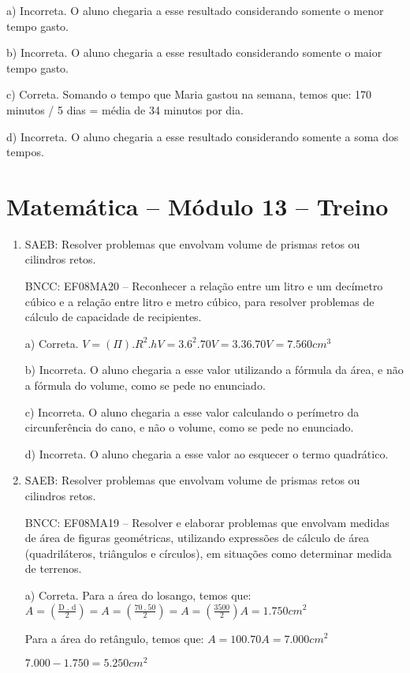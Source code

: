 \begin{enumerate}
a) Incorreta. O aluno chegaria a esse resultado considerando
somente o menor tempo gasto.

b) Incorreta. O aluno chegaria a esse resultado considerando
somente o maior tempo gasto.

c) Correta. Somando o tempo que Maria gastou na semana, temos que:
170 minutos / 5 dias = média de 34 minutos por dia.

d) Incorreta. O aluno chegaria a esse resultado considerando
somente a soma dos tempos.
\end{enumerate}


\section*{Matemática – Módulo 13 – Treino}
\begin{enumerate}
\item SAEB: Resolver problemas que envolvam volume de prismas retos ou
cilindros retos.

BNCC: EF08MA20 -- Reconhecer a relação entre um litro e um decímetro
cúbico e a relação entre litro e metro cúbico, para resolver problemas
de cálculo de capacidade de recipientes.

a) Correta.
$V = (\Pi) . R^2 .h
V = 3 . 6^2 . 70
V = 3 . 36 . 70
V = 7.560 cm^3$

b) Incorreta. O aluno chegaria a esse valor utilizando a fórmula da
área, e não a fórmula do volume, como se pede no enunciado.

c) Incorreta. O aluno chegaria a esse valor calculando o perímetro
da circunferência do cano, e não o volume, como se pede no enunciado.

d) Incorreta. O aluno chegaria a esse valor ao esquecer o termo
quadrático.
\item SAEB: Resolver problemas que envolvam volume de prismas retos ou
cilindros retos.

BNCC: EF08MA19 -- Resolver e elaborar problemas que envolvam medidas de
área de figuras geométricas, utilizando expressões de cálculo de área
(quadriláteros, triângulos e círculos), em situações como determinar
medida de terrenos.

a) Correta. Para a área do losango, temos que:
$A = (\frac{\text{D\ .\ d}}{2})=
A = (\frac{70\ .\ 50}{2})=
A = (\frac{3500}{2})
A = 1.750 cm^2$

Para a área do retângulo, temos que:
$A = 100 . 70
A = 7.000 cm^2$

$7.000 - 1.750 = 5.250 cm^2$


\end{enumerate}
